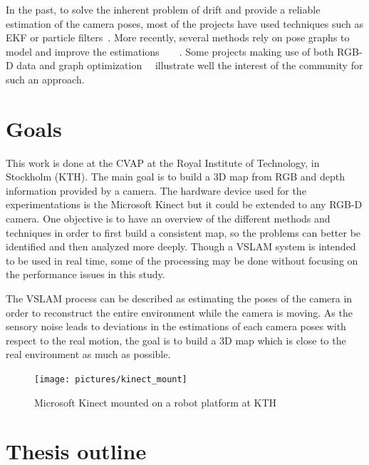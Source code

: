 In the past, to solve the inherent problem of drift and provide a reliable estimation of the camera poses, most of the projects have used techniques such as \gls{EKF} or particle filters~\cite{Thrun_2005}. More recently, several methods rely on pose graphs to model and improve the estimations~\cite{Thrun05_GraphSLAM}~\cite{grisetti07rss}~\cite{g2o_2011}~\cite{hogman_2010}. Some projects making use of both RGB-D data and graph optimization~\cite{Henry_RGBD_2010}~\cite{engelhard11euron-workshop} illustrate well the interest of the community for such an approach.

\clearpage
\section{Goals}

This work is done at the \gls{CVAP} at the Royal Institute of Technology, in Stockholm (KTH). The main goal is to build a 3D map from RGB and depth information provided by a camera. The hardware device used for the experimentations is the Microsoft Kinect but it could be extended to any RGB-D camera. One objective is to have an overview of the different methods and techniques in order to first build a consistent map, so the problems can better be identified and then analyzed more deeply. Though a \gls{VSLAM} system is intended to be used in real time, some of the processing may be done without focusing on the performance issues in this study. 

The \gls{VSLAM} process can be described as estimating the poses of the camera in order to reconstruct the entire environment while the camera is moving. As the sensory noise leads to deviations in the estimations of each camera poses with respect to the real motion, the goal is to build a 3D map which is close to the real environment as much as possible.

\begin{figure}[H]
\centering
\texttt{[image: pictures/kinect\_mount]}
\caption{Microsoft Kinect mounted on a robot platform at KTH}
\end{figure}

\clearpage
\section{Thesis outline}

